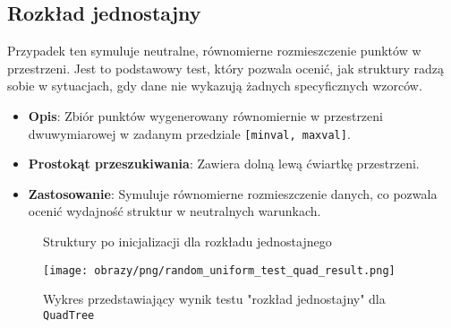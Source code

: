 \documentclass[12pt]{article}
\begin{document}
\subsection{Rozkład jednostajny}
Przypadek ten symuluje neutralne, równomierne rozmieszczenie punktów w przestrzeni. Jest to podstawowy test, który pozwala ocenić, jak struktury radzą sobie w sytuacjach, gdy dane nie wykazują żadnych specyficznych wzorców.
\begin{itemize}
    \item \textbf{Opis}: Zbiór punktów wygenerowany równomiernie w przestrzeni dwuwymiarowej w zadanym przedziale \texttt{[minval, maxval]}.
    \item \textbf{Prostokąt przeszukiwania}: Zawiera dolną lewą ćwiartkę przestrzeni.
    \item \textbf{Zastosowanie}: Symuluje równomierne rozmieszczenie danych, co pozwala ocenić wydajność struktur w neutralnych warunkach.
\end{itemize}
\nopagebreak
\begin{figure}[h]
    \centering
    \qquad
    \caption{Struktury po inicjalizacji dla rozkładu jednostajnego}%
    \label{fig:random_uniform}%
\end{figure}

\begin{figure}[h]
    \centering
    \texttt{[image: obrazy/png/random\_uniform\_test\_quad\_result.png]}
    \caption{Wykres przedstawiający wynik testu "rozkład jednostajny" dla \texttt{QuadTree}}
    \label{fig:random_uniform_test_quad_result}
\end{figure}
\end{document}
